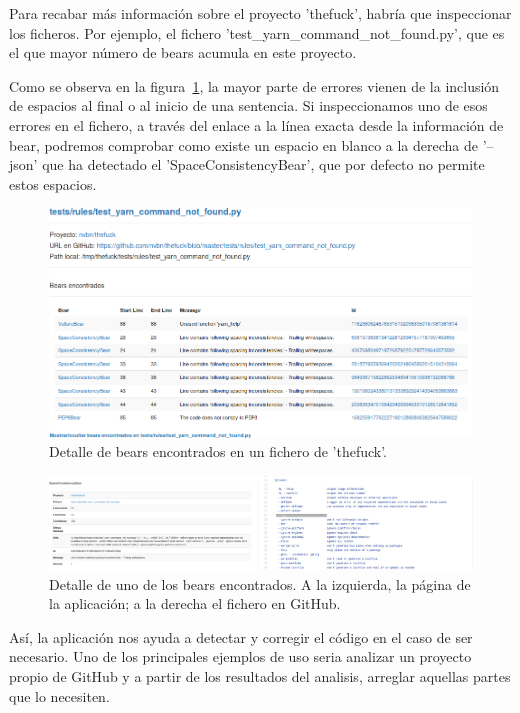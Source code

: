 \documentclass[a4paper, 12pt]{book}
\begin{document}
Para recabar más información sobre el proyecto 'thefuck', habría que inspeccionar los ficheros. Por ejemplo, el fichero 'test\_yarn\_command\_not\_found.py', que es el que mayor número de bears acumula en este proyecto.

Como se observa en la figura~\ref{fig:ficheroTheFuck}, la mayor parte de errores vienen de la inclusión de espacios al final o al inicio de una sentencia. Si inspeccionamos uno de esos errores en el fichero, a través del enlace a la línea exacta desde la información de bear, podremos comprobar como existe un espacio en blanco a la derecha de '--json' que ha detectado el 'SpaceConsistencyBear', que por defecto no permite estos espacios.

\begin{figure}[H]
  \centering
  \includegraphics[width=15cm, keepaspectratio]{img/ficheroTheFuck}
  \caption{Detalle de bears encontrados en un fichero de 'thefuck'.}
  \label{fig:ficheroTheFuck}
\end{figure}

\begin{figure}[H]
  \centering
  \includegraphics[width=15cm, keepaspectratio]{img/bearData}
  \caption{Detalle de uno de los bears encontrados. A la izquierda, la página de la aplicación; a la derecha el fichero en GitHub.}
  \label{fig:bearData}
\end{figure}

Así, la aplicación nos ayuda a detectar y corregir el código en el caso de ser necesario. Uno de los principales ejemplos de uso seria analizar un proyecto propio de GitHub y a partir de los resultados del analisis, arreglar aquellas partes que lo necesiten.
\end{document}

